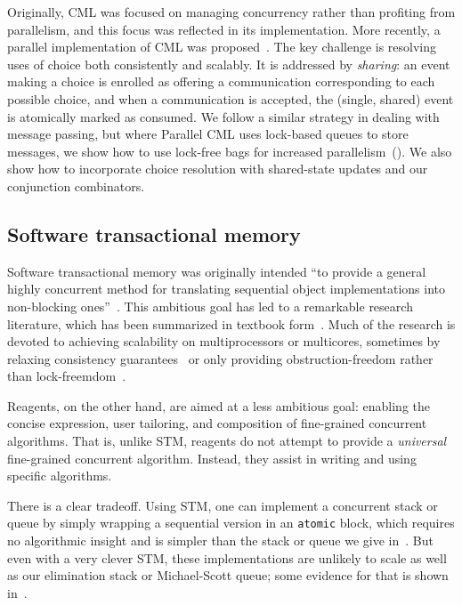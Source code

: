 \documentclass[preprint]{sigplanconf}
\begin{document}
Originally, CML was focused on managing concurrency rather than profiting from
parallelism, and this focus was reflected in its implementation.  More
recently, a parallel implementation of CML was proposed~\cite{Reppy2009}.  The
key challenge is resolving uses of choice both consistently and scalably.  It
is addressed by \emph{sharing}: an event making a choice is enrolled as
offering a communication corresponding to each possible choice, and when a
communication is accepted, the (single, shared) event is atomically marked as
consumed.  We follow a similar strategy in dealing with message passing, but
where Parallel CML uses lock-based queues to store messages, we show how to
use lock-free bags for increased parallelism~().  We
also show how to incorporate choice resolution with shared-state updates and
our conjunction combinators.


\subsection{Software transactional memory}
\label{sec:stm}

Software transactional memory was originally intended ``to provide a general
highly concurrent method for translating sequential object implementations
into non-blocking ones''~\cite{Shavit1997}.  This ambitious goal has led to a
remarkable research literature, which has been summarized in textbook
form~\cite{Larus2006}.  Much of the research is devoted to achieving
scalability on multiprocessors or multicores, sometimes by relaxing
consistency guarantees~\cite{?} or only providing obstruction-freedom rather
than lock-freemdom~\cite{Herlihy2003}.  %

Reagents, on the other hand, are aimed at a less ambitious goal: enabling the
concise expression, user tailoring, and composition of fine-grained concurrent
algorithms.  That is, unlike STM, reagents do not attempt to provide a
\emph{universal} fine-grained concurrent algorithm.  Instead, they assist in
writing and using specific algorithms.  

There is a clear tradeoff.  Using STM, one can implement a concurrent stack or
queue by simply wrapping a sequential version in an \lstinline{atomic} block,
which requires no algorithmic insight and is simpler than the stack or queue
we give in~.  But even with a very clever STM, these
implementations are unlikely to scale as well as our elimination stack or
Michael-Scott queue; some evidence for that is shown in~.
\end{document}
